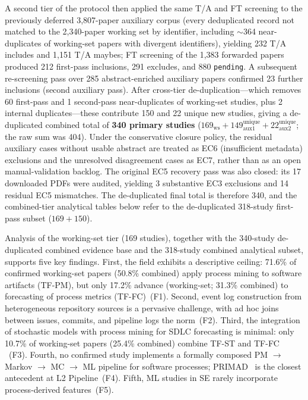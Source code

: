 A second tier of the protocol then applied the same T/A and FT screening to
the previously deferred 3{,}807-paper auxiliary corpus (every deduplicated
record not matched to the 2{,}340-paper working set by identifier, including
$\sim$364 near-duplicates of working-set papers with divergent identifiers),
yielding 232 T/A
includes and 1{,}151 T/A maybes; FT screening of the 1{,}383 forwarded
papers produced 212 first-pass inclusions, 291 excludes, and 880
\texttt{pending}. A subsequent re-screening
pass over 285 abstract-enriched auxiliary papers confirmed 23 further
inclusions (second auxiliary pass). After cross-tier de-duplication---which
removes 60 first-pass and 1 second-pass near-duplicates of working-set
studies, plus 2 internal duplicates---these contribute 150 and 22 unique
new studies, giving a de-duplicated combined total of
\textbf{340 primary studies} ($169_{\text{ws}} +
149_{\text{aux1}}^{\text{unique}} + 22_{\text{aux2}}^{\text{unique}}$; the
raw sum was 404). Under the conservative closure policy, the residual
auxiliary cases without usable abstract are treated as EC6 (insufficient
metadata) exclusions and the unresolved disagreement cases as EC7, rather
than as an open manual-validation backlog. The original EC5 recovery pass was also closed:
its 17 downloaded PDFs were audited, yielding 3 substantive EC3 exclusions
and 14 residual EC5 mismatches. The de-duplicated final total is therefore
340, and the combined-tier analytical tables below refer to the
de-duplicated 318-study first-pass subset
($169 + 150$).

Analysis of the working-set tier (169 studies), together with the 340-study
de-duplicated combined evidence base and the 318-study combined analytical
subset, supports
five key findings. First, the field exhibits a descriptive
ceiling: 71.6\% of confirmed working-set papers (50.8\% combined) apply
process mining to software artifacts (TF-PM), but only 17.2\% advance
(working-set; 31.3\% combined) to forecasting of process metrics
(TF-FC)~(F1). Second, event log construction from heterogeneous repository
sources is a pervasive challenge, with ad hoc joins between issues, commits,
and pipeline logs the norm~(F2). Third, the integration of stochastic models
with process mining for SDLC forecasting is minimal: only 10.7\% of
working-set papers (25.4\% combined) combine TF-ST and TF-FC ~(F3). Fourth, no
confirmed study implements
a formally composed PM $\rightarrow$ Markov $\rightarrow$ MC $\rightarrow$ ML
pipeline for software processes; PRIMAD~\cite{guinea2025} is the closest
antecedent at L2 Pipeline~(F4). Fifth, ML studies in SE rarely incorporate process-derived
features~(F5).

